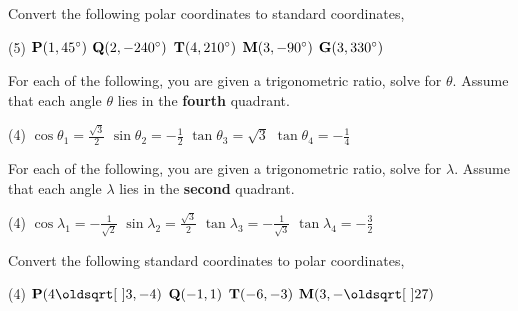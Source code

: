 \documentclass[12pt]{article} %
\begin{document}
\begin{qstn}
     Convert the following polar coordinates to standard coordinates,
    \begin{tasks}(5)
     \task $\vb P(1, 45^{\circ})$
     \task $\vb Q(2, -240^{\circ})$ 
     \task $\vb T(4, 210^{\circ})$
     \task $\vb M(3, -90^{\circ})$ 
     \task $\vb G(3, 330^{\circ})$
    \end{tasks}
\end{qstn}

\begin{qstn}
  For each of the following, you are given a trigonometric ratio, solve for $\theta$. 
  Assume that each angle  $\theta$ lies in the \textbf{fourth} quadrant.
    \begin{tasks}(4)
       \task $\cos \theta_1 = \frac{\sqrt{3}}{2}$
       \task $\sin \theta_2 = -\frac{1}{2} $
       \task $\tan \theta_3 = \sqrt{3} $
       \task $\tan \theta_4 = -\frac{1}{4}$
    \end{tasks}
\end{qstn}

\begin{qstn}
  For each of the following, you are given a trigonometric ratio, solve for $\lambda$. 
  Assume that each angle  $\lambda$ lies in the \textbf{second} quadrant.
    \begin{tasks}(4)
       \task $\cos \lambda_1 = -\frac{1}{\sqrt{2}}$
       \task $\sin \lambda_2 = \frac{\sqrt{3}}{2}$
       \task $\tan \lambda_3 = -\frac{1}{\sqrt{3}}$
       \task $\tan \lambda_4 = -\frac{3}{2}$
    \end{tasks}
\end{qstn}

\begin{qstn}
     Convert the following standard coordinates to polar coordinates,
    \begin{tasks}(4)
     \task $\vb P\left(4\sqrt{3}, -4\right)$
     \task $\vb Q(-1,1)$ 
     \task $\vb T\left(-6,-3\right)$
     \task $\vb M\left(3,-\sqrt{27} \right)$ 
    \end{tasks}
\end{qstn}
\end{document}
